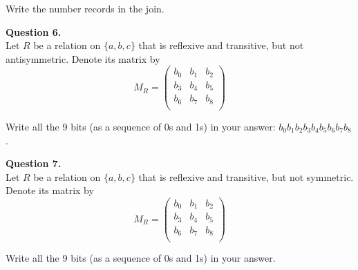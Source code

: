 \documentclass[jou]{apa6}
\begin{document}
Write the number records in the join.

\vspace{6pt}
{\bf Question 6.}\\
Let $R$ be a relation on $\{a, b, c\}$ that is reflexive and transitive, but not antisymmetric.
Denote its matrix by
$$M_R =  \left( \begin{array}{ccc}
b_{0} & b_1 & b_2 \\
b_{3} & b_4 & b_5 \\
b_{6} & b_7 & b_8 \\
\end{array} \right)$$

Write all the 9 bits (as a sequence of 0s and 1s) in your answer: $b_0b_1b_2b_3b_4b_5b_6b_7b_8$.



\vspace{6pt}
{\bf Question 7.}\\
Let $R$ be a relation on $\{a, b, c\}$ that is reflexive and transitive, but not symmetric.
Denote its matrix by
$$M_R =  \left( \begin{array}{ccc}
b_{0} & b_1 & b_2 \\
b_{3} & b_4 & b_5 \\
b_{6} & b_7 & b_8 \\
\end{array} \right)$$

Write all the 9 bits (as a sequence of 0s and 1s) in your answer.
\end{document}
